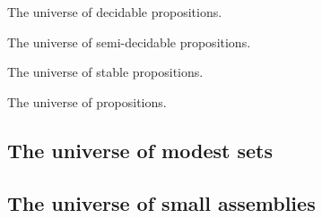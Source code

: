 The universe of decidable propositions.

The universe of semi-decidable propositions.

The universe of stable propositions.

The universe of propositions.

\subsection{The universe of modest sets}
\label{sec:universe-modest-sets}

\subsection{The universe of small assemblies}
\label{sec:univ-small-assembl}



